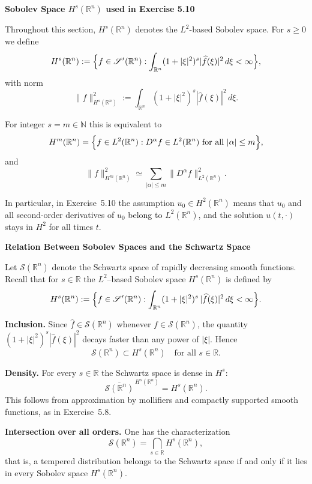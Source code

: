 \begin{problem}[CP-III-0019]
\par\medskip\noindent\textbf{Sobolev Space $H^{s}(\mathbb{R}^n)$ used in Exercise 5.10}\quad

Throughout this section, $H^{s}(\mathbb{R}^n)$ denotes the $L^2$-based Sobolev
space. For $s \ge 0$ we define
\[
H^{s}(\mathbb{R}^n)
:= \Bigl\{ f \in \mathscr{S}'(\mathbb{R}^n)
: \int_{\mathbb{R}^n} (1+|\xi|^2)^s |\widehat{f}(\xi)|^2 \, d\xi
< \infty \Bigr\},
\]
with norm
\[
\|f\|_{H^{s}(\mathbb{R}^n)}^2
:= \int_{\mathbb{R}^n} (1+|\xi|^2)^s |\widehat{f}(\xi)|^2 \, d\xi.
\]

For integer $s = m \in \mathbb{N}$ this is equivalent to
\[
H^{m}(\mathbb{R}^n)
= \Bigl\{ f \in L^2(\mathbb{R}^n)
: D^\alpha f \in L^2(\mathbb{R}^n) \text{ for all } |\alpha|\le m \Bigr\},
\]
and
\[
\|f\|_{H^{m}(\mathbb{R}^n)}^2
\simeq \sum_{|\alpha|\le m} \|D^\alpha f\|_{L^2(\mathbb{R}^n)}^2.
\]

In particular, in Exercise~5.10 the assumption $u_0 \in H^2(\mathbb{R}^n)$
means that $u_0$ and all second-order derivatives of $u_0$ belong to
$L^2(\mathbb{R}^n)$, and the solution $u(t,\cdot)$ stays in $H^2$ for all
times $t$.


\par\medskip\noindent\textbf{Relation Between Sobolev Spaces and the Schwartz Space}\quad

Let $\mathscr{S}(\mathbb{R}^n)$ denote the Schwartz space of rapidly
decreasing smooth functions. Recall that for $s\in\mathbb{R}$ the
$L^2$--based Sobolev space $H^s(\mathbb{R}^n)$ is defined by
\[
H^s(\mathbb{R}^n)
:= \Bigl\{ f\in\mathscr{S}'(\mathbb{R}^n) :
\int_{\mathbb{R}^n} (1+|\xi|^2)^s \,|\widehat{f}(\xi)|^2 \, d\xi
< \infty \Bigr\}.
\]

\par\smallskip\noindent\textbf{Inclusion.}\quad
Since $\widehat{f}\in\mathscr{S}(\mathbb{R}^n)$ whenever
$f\in\mathscr{S}(\mathbb{R}^n)$, the quantity
$(1+|\xi|^2)^s|\widehat{f}(\xi)|^2$ decays faster than any power of
$|\xi|$. Hence
\[
\mathscr{S}(\mathbb{R}^n) \subset H^s(\mathbb{R}^n)
\quad\text{for all } s\in\mathbb{R}.
\]

\par\smallskip\noindent\textbf{Density.}\quad
For every $s\in\mathbb{R}$ the Schwartz space is dense in $H^s$:
\[
\overline{\mathscr{S}(\mathbb{R}^n)}^{\,H^s(\mathbb{R}^n)}
= H^s(\mathbb{R}^n).
\]
This follows from approximation by mollifiers and compactly supported
smooth functions, as in Exercise~5.8.

\par\smallskip\noindent\textbf{Intersection over all orders.}\quad
One has the characterization
\[
\mathscr{S}(\mathbb{R}^n)
= \bigcap_{s\in\mathbb{R}} H^s(\mathbb{R}^n),
\]
that is, a tempered distribution belongs to the Schwartz space if and
only if it lies in every Sobolev space $H^s(\mathbb{R}^n)$.


\end{problem}
